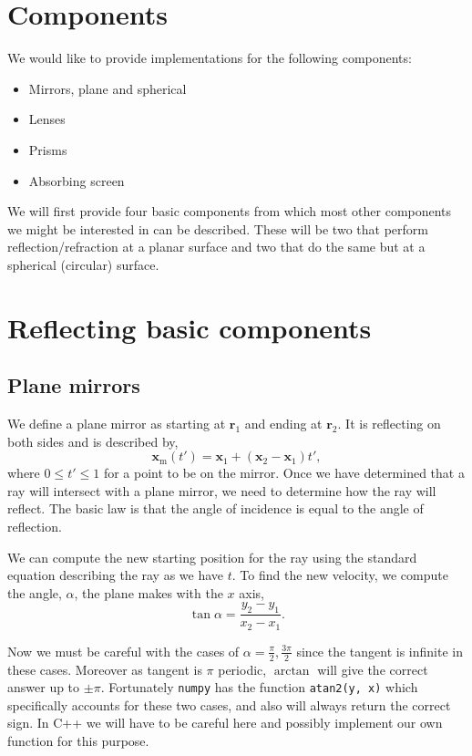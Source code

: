 \documentclass{article}
\let\vec \bm
\begin{document}
\section{Components}
We would like to provide implementations for the following components:
\begin{itemize}
    \item Mirrors, plane and spherical
    \item Lenses
    \item Prisms
    \item Absorbing screen
\end{itemize}
We will first provide four basic components from which most other components we might be interested in can be described. These will be two that perform reflection/refraction at a planar surface and two that do the same but at a spherical (circular) surface.

\section{Reflecting basic components}
\subsection{Plane mirrors}
We define a plane mirror as starting at $\vec{r}_1$ and ending at $\vec{r}_2$. It is reflecting on both sides and is described by,
\begin{equation}
    \vec{x}_\mathrm{m}(t')
    =
    \vec{x}_1 + (\vec{x}_2 - \vec{x}_1) t',
\end{equation}
where $0 \le t' \le 1$ for a point to be on the mirror. Once we have determined that a ray will intersect with a plane mirror, we need to determine how the ray will reflect. The basic law is that the angle of incidence is equal to the angle of reflection.

We can compute the new starting position for the ray using the standard equation describing the ray as we have $t$. To find the new velocity, we compute the angle, $\alpha$, the plane makes with the $x$ axis,
\begin{equation}
    \label{eq:plane_angle}
    \tan \alpha
    =
    \frac{y_2 - y_1}{x_2 - x_1}.
\end{equation}

Now we must be careful with the cases of $\alpha = \frac{\pi}{2}, \frac{3\pi}{2}$ since the tangent is infinite in these cases. Moreover as tangent is $\pi$ periodic, $\arctan$ will give the correct answer up to $\pm \pi$. Fortunately \texttt{numpy} has the function \texttt{atan2(y, x)} which specifically accounts for these two cases, and also will always return the correct sign. In C++ we will have to be careful here and possibly implement our own function for this purpose.
\end{document}
